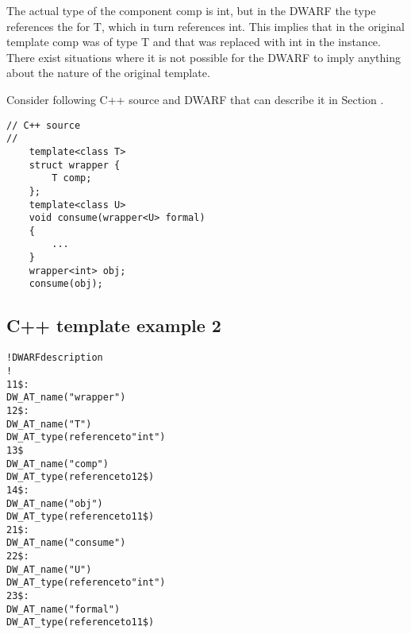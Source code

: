 The actual type of the component comp is int, but in the DWARF
the type references the  for
T, which in turn references int. This implies that in the
original template comp was of type T and that was replaced
with int in the instance.  There exist situations where it is
not possible for the DWARF to imply anything about the nature
of the original template. 

Consider following C++ source and DWARF 
that can describe it in
Section .


\begin{lstlisting}
// C++ source
//
    template<class T>
    struct wrapper {
        T comp;
    };
    template<class U>
    void consume(wrapper<U> formal)
    {
        ...
    }
    wrapper<int> obj;
    consume(obj);
\end{lstlisting}

\subsection{C++ template example 2}
\label{app:ctemplateexample2}
\begin{alltt}
! DWARF description
!
11\$: 
        DW\-\_AT\-\_name("wrapper")
12\$:   
            DW\-\_AT\-\_name("T")
            DW\-\_AT\-\_type(reference to "int")
13\$    
            DW\-\_AT\-\_name("comp")
            DW\-\_AT\-\_type(reference to 12\$)
14\$: 
        DW\-\_AT\-\_name("obj")
        DW\-\_AT\-\_type(reference to 11\$)
21\$: 
        DW\-\_AT\-\_name("consume")
22\$:   
            DW\-\_AT\-\_name("U")
            DW\-\_AT\-\_type(reference to "int")
23\$:   
            DW\-\_AT\-\_name("formal")
            DW\-\_AT\-\_type(reference to 11\$)
\end{alltt}

